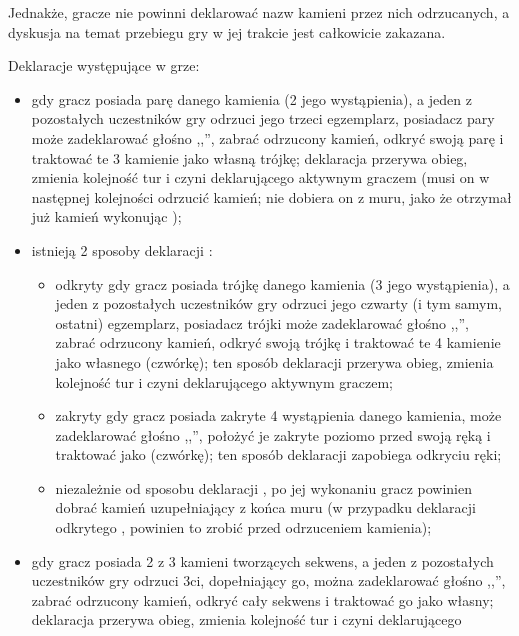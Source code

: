 Jednakże, gracze nie powinni deklarować nazw kamieni przez nich odrzucanych, a
dyskusja na temat przebiegu gry w jej trakcie jest całkowicie zakazana.

Deklaracje występujące w grze: 
\begin{itemize}
  \item {}
  gdy gracz posiada parę danego kamienia (2 jego wystąpienia), a jeden z
  pozostałych uczestników gry odrzuci jego trzeci egzemplarz, posiadacz pary
  może zadeklarować głośno ,,'', zabrać odrzucony kamień, odkryć
  swoją parę i traktować te 3 kamienie jako własną trójkę; deklaracja
   przerywa obieg, zmienia kolejność tur i czyni deklarującego
  aktywnym graczem (musi on w następnej kolejności odrzucić kamień; nie dobiera
  on z muru, jako że otrzymał już kamień wykonując );
  \item {}
  istnieją 2 sposoby deklaracji :
    \begin{itemize}
    \item odkryty 
    gdy gracz posiada trójkę danego kamienia (3 jego wystąpienia), a jeden z
    pozostałych uczestników gry odrzuci jego czwarty (i tym samym, ostatni)
    egzemplarz, posiadacz trójki może zadeklarować głośno ,,'',
    zabrać odrzucony kamień, odkryć swoją trójkę i traktować te 4 kamienie jako
    własnego  (czwórkę); ten sposób deklaracji 
    przerywa obieg, zmienia kolejność tur i czyni deklarującego aktywnym graczem;
    \item zakryty  \label{closed_gang}
    gdy gracz posiada zakryte 4 wystąpienia danego kamienia, może zadeklarować
    głośno ,,'', położyć je zakryte poziomo przed swoją ręką i
    traktować jako  (czwórkę); ten sposób deklaracji zapobiega
    odkryciu ręki;
    \item niezależnie od sposobu deklaracji , po jej wykonaniu
    gracz powinien dobrać kamień uzupełniający z końca muru (w przypadku
    deklaracji odkrytego , powinien to zrobić przed odrzuceniem
    kamienia);
    \end{itemize}
  \item {}
  gdy gracz posiada 2 z 3 kamieni tworzących sekwens, a jeden z pozostałych
  uczestników gry odrzuci 3ci, dopełniający go, można zadeklarować
  głośno ,,'', zabrać odrzucony kamień, odkryć cały sekwens i
  traktować go jako własny; deklaracja
   przerywa obieg, zmienia kolejność tur i czyni deklarującego

\end{itemize}
